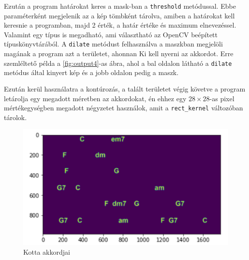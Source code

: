 Ezután a program határokat keres a mask-ban a \texttt{threshold} metódussal. Ebbe paraméterként megjelenik az a kép tömbként tárolva, amiben a határokat kell keresnie a programban, majd 2 érték, a határ értéke és maximum elnevezéssel. Valamint egy típus is megadható, ami választható az OpenCV beépített típuskönyvtárából. A \texttt{dilate} metódust felhasználva a maszkban megjelöli magának a program azt a területet, ahonnan Ki kell nyerni az akkordot. Erre szemléltető példa a \ref{fig:output4}-as ábra, ahol a bal oldalon látható a \texttt{dilate} metódus által kinyert kép és a jobb oldalon pedig a maszk.

Ezután kerül használatra a kontúrozás, a talált területet végig követve a program letárolja egy megadott méretben az akkordokat, én ehhez egy $28 \times 28$-as pixel mértékegységben megadott négyzetet használok, amit a \texttt{rect\_kernel} változóban tárolok.

\begin{figure}[h]
	\includegraphics[width=\textwidth]{images/output_justchords.png}
	\caption{Kotta akkordjai}
	\label{fig:output2}
\end{figure}

